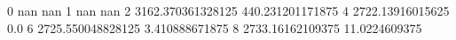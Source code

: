 0 nan nan
1 nan nan
2 3162.370361328125 440.231201171875
4 2722.13916015625 0.0
6 2725.550048828125 3.410888671875
8 2733.16162109375 11.0224609375

